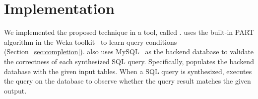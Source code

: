 
\section{Implementation}
\label{sec:implementation}
\vspace{-1mm}

We implemented the proposed technique in a tool, called \ourtool. 
\ourtool uses the built-in PART algorithm in
the Weka toolkit~\cite{Hall:2009} to learn query conditions
(Section~\ref{sec:completion}). \ourtool also uses
MySQL~\cite{mysql} as the backend
database to validate the correctness of each synthesized 
SQL query. Specifically, \ourtool populates the backend database
with the given input tables. When a SQL query is
synthesized, \ourtool executes the query on the database
to observe whether the query result matches the given output.
